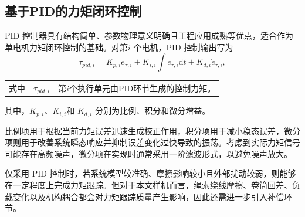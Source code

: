 \subsection{基于PID的力矩闭环控制}

PID 控制器具有结构简单、参数物理意义明确且工程应用成熟等优点，适合作为单电机力矩闭环控制的基础。对第$i$ 个电机，PID 控制输出写为
\begin{equation}
  \tau_{pid,i} = K_{p,i}e_{\tau,i} + K_{i,i}\int e_{\tau,i}\mathrm dt + K_{d,i}\dot e_{\tau,i}, \label{eq:ch4-pid}
\end{equation}
\begin{tabularx}{\textwidth}{@{}l@{\quad}r@{———}X@{}}
  式中 & $\tau_{pid,i}$ & 第$i$个执行单元由PID环节生成的控制力矩。
\end{tabularx}
其中，$K_{p,i}$、$K_{i,i}$和 $K_{d,i}$ 分别为比例、积分和微分增益。

比例项用于根据当前力矩误差迅速生成校正作用，积分项用于减小稳态误差，微分项则用于改善系统瞬态响应并抑制误差变化过快导致的振荡。考虑到实际力矩信号可能存在高频噪声，微分项在实现时通常采用一阶滤波形式，以避免噪声放大。

仅采用 PID 控制时，若系统模型较准确、摩擦影响较小且外部扰动较弱，则能够在一定程度上完成力矩跟踪。但对于本文样机而言，绳索绕线摩擦、卷筒回差、负载变化以及机构耦合都会对力矩跟踪质量产生影响，因此还需进一步引入补偿环节。

